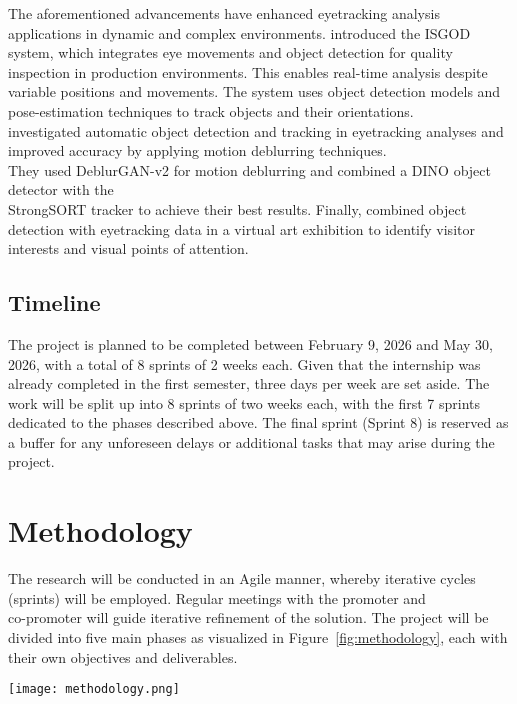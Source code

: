 \documentclass[english]{hogent-article}
\begin{document}
The aforementioned advancements have enhanced eyetracking analysis applications in dynamic and complex environments.
\textcite{Cho2024} introduced the ISGOD system, which integrates eye movements and object detection for quality inspection in production 
environments. This enables real-time analysis despite variable positions and movements. 
The system uses object detection models and pose-estimation techniques to track objects and their orientations.\\
\textcite{Cederin2023} investigated automatic object detection and tracking in eyetracking analyses and improved accuracy by applying motion deblurring techniques.\\ 
They used DeblurGAN-v2 for motion deblurring and combined a DINO object detector with the\\ StrongSORT tracker to achieve their best results.
Finally, \textcite{Kulyk2023} combined object detection with eyetracking data in a virtual art exhibition to identify visitor interests and visual points of attention.

\subsection{Timeline}

The project is planned to be completed between February 9, 2026 and May 30, 2026, with a total of 8 sprints of 2 weeks each.
Given that the internship was already completed in the first semester, three days per week are set aside.
The work will be split up into 8 sprints of two weeks each, with the first 7 sprints dedicated to the phases described above.
The final sprint (Sprint 8) is reserved as a buffer for any unforeseen delays or additional tasks that may arise during the project.

\section{Methodology}
\label{sec:methodology}

The research will be conducted in an Agile manner, whereby iterative cycles (sprints) will be employed.
Regular meetings with the promoter and\\ co-promoter will guide iterative refinement of the solution.
The project will be divided into five main phases as visualized in Figure~\ref{fig:methodology}, each with their own objectives and deliverables.

\begin{figure*}
  \centering
  \texttt{[image: methodology.png]}
  \caption{Overview of the project phases, their deliverables, and the relationships between them.}
  \label{fig:methodology}
\end{figure*}
\end{document}
